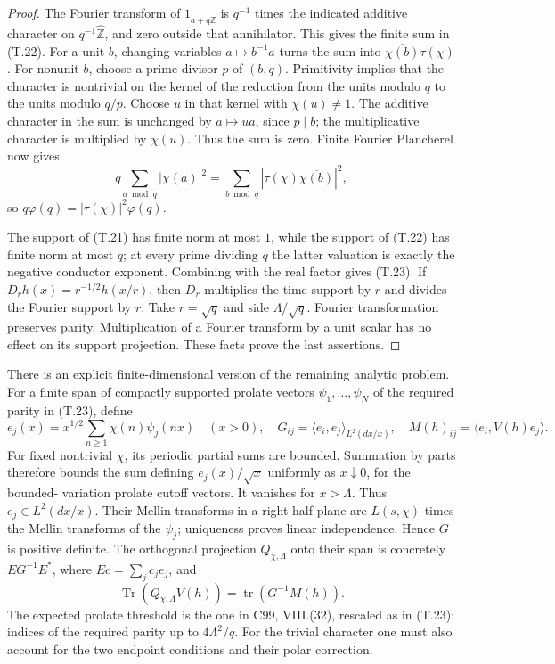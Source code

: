 \begin{proof}
The Fourier transform of \(1_{a+q\widehat{\mathbb Z}}\)
is \(q^{-1}\) times the indicated additive
character on \(q^{-1}\widehat{\mathbb Z}\),
and zero outside that annihilator. This gives
the finite sum in (T.22).
For a unit \(b\), changing variables \(a\mapsto
b^{-1}a\) turns the sum into
\(\overline{\chi(b)}\tau(\chi)\).
For nonunit \(b\), choose a prime divisor \(p\)
of \((b,q)\). Primitivity implies that the
character is nontrivial on the kernel of the
reduction from the units modulo \(q\) to the
units modulo \(q/p\). Choose \(u\) in that
kernel with \(\chi(u)\ne1\). The additive
character in the sum is unchanged by
\(a\mapsto ua\), since \(p\mid b\);
the multiplicative character is multiplied by
\(\chi(u)\). Thus the sum is zero.
Finite Fourier Plancherel now gives
\[
 q\sum_{a\bmod q}|\chi(a)|^2
   =\sum_{b\bmod q}
        |\tau(\chi)\overline{\chi(b)}|^2,
\]
so \(q\varphi(q)=|\tau(\chi)|^2\varphi(q)\).

The support of (T.21) has finite norm at most
\(1\), while the support of (T.22) has finite
norm at most \(q\); at every prime dividing
\(q\) the latter valuation is exactly the
negative conductor exponent. Combining with
the real factor gives (T.23). If
\(D_r h(x)=r^{-1/2}h(x/r)\), then \(D_r\)
multiplies the time support by \(r\) and
divides the Fourier support by \(r\). Take
\(r=\sqrt q\) and side
\(\Lambda/\sqrt q\).
Fourier transformation preserves parity.
Multiplication of a Fourier transform by a
unit scalar has no effect on its support
projection. These facts prove the last
assertions.
\end{proof}

There is an explicit finite-dimensional version
of the remaining analytic problem. For a finite
span of compactly supported prolate vectors
\(\psi_1,\ldots,\psi_N\) of the required parity
in (T.23), define
\[
 e_j(x)=x^{1/2}\sum_{n\geq1}\chi(n)\psi_j(nx)
       \quad(x>0),\quad
 G_{ij}=\langle e_i,e_j\rangle_{L^2(dx/x)},\quad
 M(h)_{ij}=\langle e_i,V(h)e_j\rangle .                         \tag{T.24}
\]
For fixed nontrivial \(\chi\), its periodic partial
sums are bounded. Summation by parts therefore
bounds the sum defining \(e_j(x)/\sqrt x\)
uniformly as \(x\downarrow0\), for the bounded-
variation prolate cutoff vectors. It vanishes
for \(x>\Lambda\). Thus \(e_j\in L^2(dx/x)\).
Their Mellin transforms in a right half-plane
are \(L(s,\chi)\) times the Mellin transforms
of the \(\psi_j\); uniqueness proves linear
independence. Hence \(G\) is positive definite.
The orthogonal projection \(Q_{\chi,\Lambda}\)
onto their span is concretely
\(E G^{-1}E^*\), where \(Ec=\sum_jc_je_j\), and
\[
 \operatorname{Tr}(Q_{\chi,\Lambda}V(h))
           =\operatorname{tr}(G^{-1}M(h)).                    \tag{T.25}
\]
The expected prolate threshold is the one in
C99, VIII.(32), rescaled as in (T.23):
indices of the required parity up to
\(4\Lambda^2/q\). For the trivial character
one must also account for the two endpoint
conditions and their polar correction.

